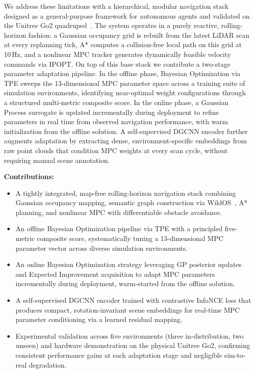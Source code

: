 \documentclass[conference]{IEEEtran}
\begin{document}
We address these limitations with a hierarchical, modular navigation stack designed as a general-purpose framework for autonomous agents and validated on the Unitree Go2 quadruped~\cite{@TODO}. The system operates in a purely reactive, rolling-horizon fashion: a Gaussian occupancy grid is rebuilt from the latest LiDAR scan at every replanning tick, A* computes a collision-free local path on this grid at 10\,Hz, and a nonlinear MPC tracker generates dynamically feasible velocity commands via IPOPT. On top of this base stack we contribute a two-stage parameter adaptation pipeline. In the offline phase, Bayesian Optimization via TPE sweeps the 13-dimensional MPC parameter space across a training suite of simulation environments, identifying near-optimal weight configurations through a structured multi-metric composite score. In the online phase, a Gaussian Process surrogate is updated incrementally during deployment to refine parameters in real time from observed navigation performance, with warm initialization from the offline solution. A self-supervised DGCNN encoder further augments adaptation by extracting dense, environment-specific embeddings from raw point clouds that condition MPC weights at every scan cycle, without requiring manual scene annotation.

\textbf{Contributions:}
\begin{itemize}
	\item A tightly integrated, map-free rolling-horizon navigation stack combining Gaussian occupancy mapping, semantic graph construction via WildOS~\cite{shah2026wildosopenvocabularyobjectsearch}, A* planning, and nonlinear MPC with differentiable obstacle avoidance.
	\item An offline Bayesian Optimization pipeline via TPE with a principled five-metric composite score, systematically tuning a 13-dimensional MPC parameter vector across diverse simulation environments.
	\item An online Bayesian Optimization strategy leveraging GP posterior updates and Expected Improvement acquisition to adapt MPC parameters incrementally during deployment, warm-started from the offline solution.
	\item A self-supervised DGCNN encoder trained with contrastive InfoNCE loss that produces compact, rotation-invariant scene embeddings for real-time MPC parameter conditioning via a learned residual mapping.
	\item Experimental validation across five environments (three in-distribution, two unseen) and hardware demonstration on the physical Unitree Go2, confirming consistent performance gains at each adaptation stage and negligible sim-to-real degradation.
\end{itemize}
\end{document}
